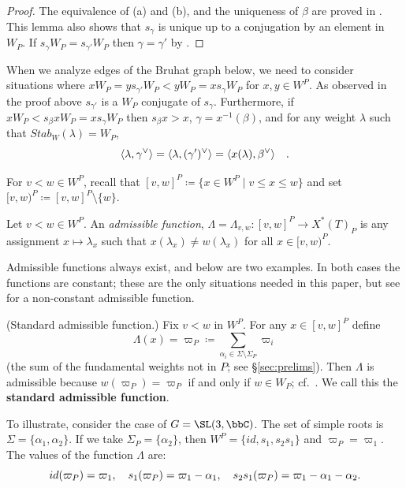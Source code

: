 \begin{proof} The equivalence of (a) and (b), and the uniqueness of $\beta$ are proved in 
	\cite[Lemma 4.1]{fulton.woodward}. This lemma also shows that $s_\gamma$ 
	is unique up to a conjugation by an element in $W_P$. If 
	$s_\gamma W_P = s_{\gamma'}W_P$ then $\gamma = \gamma'$ by 
	\cite[Lemma 2.2]{buch.m:nbhds}.\end{proof}
\begin{remark}\label{rem:gammabeta} When we analyze edges of the Bruhat graph below, 
	we need to consider situations where
	$x W_P = y s_{\gamma'} W_P < y W_P= x s_\gamma W_P$ for $x,y \in W^P$. As observed in the proof 
	above $s_{\gamma'}$ is a $W_P$ conjugate of $s_\gamma$. Furthermore, if
	$xW_P < s_\beta x W_P = x s_\gamma W_P$ then $s_\beta x > x$, $\gamma = x^{-1}(\beta)$,
	and for any weight $\lambda$ such that $Stab_W(\lambda) = W_P$,
	\[ \langle \lambda , \gamma^\vee \rangle = \langle \lambda, (\gamma')^\vee \rangle = \langle x(\lambda), \beta^\vee \rangle 
	\quad \/. \]
\end{remark}
For $v<w\in W^P$, recall that $[v, w]^P\coloneqq \{x\in W^P\mid v\leq x\leq w\}$ and set $[v,w)^P\coloneqq [v, w]^P\setminus \{ w \}$.
\begin{defin} Let $v<w\in W^P$. An \textit{admissible function},
	$\Lambda=\Lambda_{v,w}:[v, w]^P \to X^{*}(T)_P$ is any assignment $x \mapsto \lambda_x$ 
	such that $x(\lambda_x)\neq w(\lambda_x)$ for all $x\in [v, w)^P$.
\end{defin} 
Admissible functions always exist, and below are two examples. In both cases the functions are constant;
	these are the only situations needed in this paper, but see  for a non-constant admissible function.
	\begin{example}\label{examp:admissible}
		(Standard admissible function.) Fix $v < w$ in $W^P$. For any $x \in [v,w]^P$ define 
		\[ \Lambda(x)=\varpi_P\coloneqq  \displaystyle\sum_{\alpha_i\in \Sigma \setminus \Sigma_P}\varpi_i \]  
		(the sum of the fundamental weights not in $P$; see \S\ref{sec:prelims}).
	Then $\Lambda$ is admissible because $w(\varpi_P) = \varpi_P$ if and only if $w \in W_P$; cf.~\cite[Ch.5, \S 4.6]{bourbaki:Lie4-6}. We call this the {\bf standard admissible function}. 
	
	To illustrate, consider the case of $G=\SL(3,\bbC)$. The set of simple roots is $\Sigma=\{\alpha_1,\alpha_2\}$. If we 
	take $\Sigma_P=\{\alpha_2\}$, then $W^P=\{id, s_1, s_2s_1\}$ and $\varpi_P=\varpi_1$. The values of the function 
	$\Lambda$ are:
	\[ id(\varpi_P)=\varpi_1 \/, \quad s_1(\varpi_P)=\varpi_1-\alpha_1\/, \quad s_2s_1(\varpi_P)=\varpi_1 - \alpha_1 - \alpha_2 \/.\]
\end{example}
